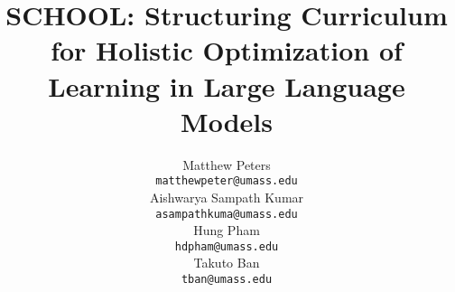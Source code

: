 \documentclass[11pt,a4paper]{article}
\title{SCHOOL: Structuring Curriculum for Holistic Optimization of Learning in Large Language Models}
\author{Matthew Peters \\
  {\tt matthewpeter@umass.edu} \\\And
  Aishwarya Sampath Kumar \\
  {\tt asampathkuma@umass.edu} \\\AND
  Hung Pham \\
  {\tt hdpham@umass.edu} \\
  \And
  Takuto Ban \\
  {\tt tban@umass.edu} \\
}
\date{}
\begin{document}
\maketitle











\footnotesize

\end{document}

